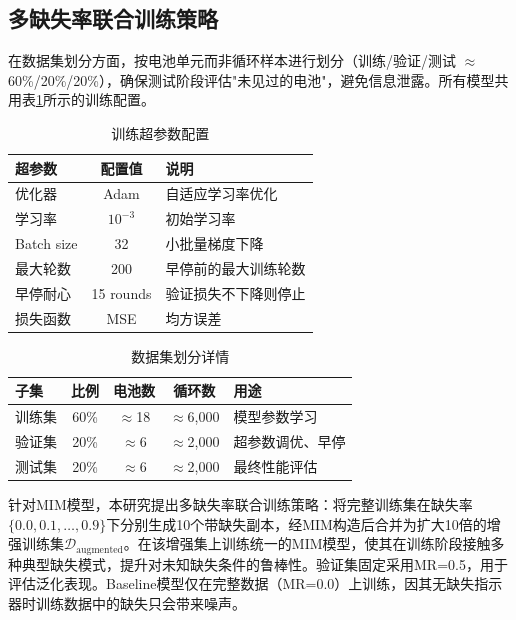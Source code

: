 \documentclass[10pt,a4paper]{ctexart}
\begin{document}
\subsection{多缺失率联合训练策略}

在数据集划分方面，按电池单元而非循环样本进行划分（训练/验证/测试 $\approx$ 60\%/20\%/20\%），确保测试阶段评估"未见过的电池"，避免信息泄露。所有模型共用表\ref{tab:training_config}所示的训练配置。

\begin{table}[H]
\centering
\caption{训练超参数配置}
\label{tab:training_config}
\begin{tabular}{@{}lcl@{}}
\toprule
\textbf{超参数} & \textbf{配置值} & \textbf{说明} \\
\midrule
优化器 & Adam & 自适应学习率优化 \\
学习率 & $10^{-3}$ & 初始学习率 \\
Batch size & 32 & 小批量梯度下降 \\
最大轮数 & 200 & 早停前的最大训练轮数 \\
早停耐心 & 15 rounds & 验证损失不下降则停止 \\
损失函数 & MSE & 均方误差 \\
\bottomrule
\end{tabular}
\end{table}

\begin{table}[H]
\centering
\caption{数据集划分详情}
\label{tab:data_split}
\begin{tabular}{@{}lcccp{5cm}@{}}
\toprule
\textbf{子集} & \textbf{比例} & \textbf{电池数} & \textbf{循环数} & \textbf{用途} \\
\midrule
训练集 & 60\% & $\approx$18 & $\approx$6,000 & 模型参数学习 \\
验证集 & 20\% & $\approx$6 & $\approx$2,000 & 超参数调优、早停 \\
测试集 & 20\% & $\approx$6 & $\approx$2,000 & 最终性能评估 \\
\bottomrule
\end{tabular}
\end{table}

针对MIM模型，本研究提出多缺失率联合训练策略：将完整训练集在缺失率$\{0.0, 0.1, \ldots, 0.9\}$下分别生成10个带缺失副本，经MIM构造后合并为扩大10倍的增强训练集$\mathcal{D}_{\text{augmented}}$。在该增强集上训练统一的MIM模型，使其在训练阶段接触多种典型缺失模式，提升对未知缺失条件的鲁棒性。验证集固定采用MR=0.5，用于评估泛化表现。Baseline模型仅在完整数据（MR=0.0）上训练，因其无缺失指示器时训练数据中的缺失只会带来噪声。
\end{document}
